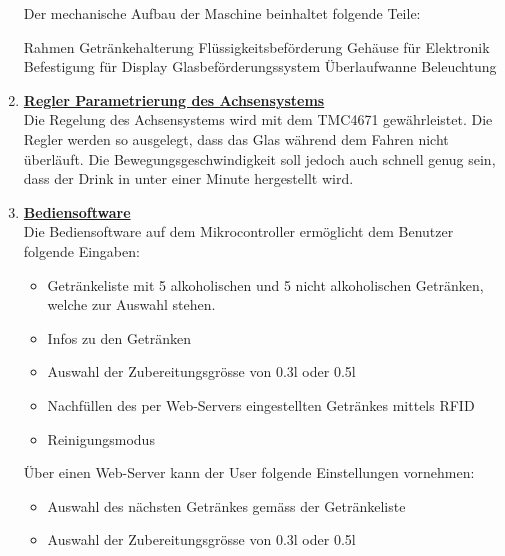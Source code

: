 \begin{enumerate}
Der mechanische Aufbau der Maschine beinhaltet folgende Teile:

\textbullet Rahmen \newline
\textbullet Getränkehalterung \newline
\textbullet Flüssigkeitsbeförderung \newline
\textbullet Gehäuse für Elektronik \newline
\textbullet Befestigung für Display \newline
\textbullet Glasbeförderungssystem \newline
\textbullet Überlaufwanne \newline
\textbullet Beleuchtung\\
\newpage

\item \underline{\textbf{Regler Parametrierung des Achsensystems}}\mbox{}\\

Die Regelung des Achsensystems wird mit dem TMC4671 gewährleistet. Die Regler werden so ausgelegt, dass das Glas während dem Fahren nicht überläuft. Die Bewegungsgeschwindigkeit soll jedoch auch schnell genug sein, dass der Drink in unter einer Minute hergestellt wird.\\

\item \underline{\textbf{Bediensoftware}}\mbox{}\\

Die Bediensoftware auf dem Mikrocontroller ermöglicht dem Benutzer folgende Eingaben:\\
\begin{itemize}

\item Getränkeliste mit 5 alkoholischen und 5 nicht alkoholischen Getränken, welche zur Auswahl stehen.
\item Infos zu den Getränken
\item Auswahl der Zubereitungsgrösse von 0.3l oder 0.5l
\item Nachfüllen des per Web-Servers eingestellten Getränkes mittels RFID
\item Reinigungsmodus\\
\end{itemize}

Über einen Web-Server kann der User folgende Einstellungen vornehmen: \\

\begin{itemize}
\item Auswahl des nächsten Getränkes gemäss der Getränkeliste
\item Auswahl der Zubereitungsgrösse von 0.3l oder 0.5l\\ 
\end{itemize} 



\end{enumerate}
